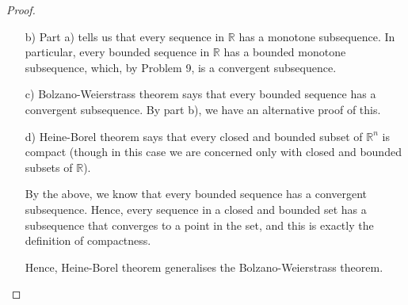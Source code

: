 \documentclass[11pt]{article}
\newcommand{\bbR}{\mathbb{R}}
\renewcommand{\_}[1]{\underline{ #1 }}
\theoremstyle{definition}
\numberwithin{equation}{subsection}
\begin{document}
\begin{proof}
\begin{enumerate}
This completes the proof.

\item[b)] Part a) tells us that every sequence in $\bbR$ has a monotone subsequence. In particular, every bounded sequence in $\bbR$ has a bounded monotone subsequence, which, by Problem 9, is a convergent subsequence.

\item[c)] Bolzano-Weierstrass theorem says that every bounded sequence has a convergent subsequence. By part b), we have an alternative proof of this.

\item[d)] Heine-Borel theorem says that every closed and bounded subset of $\bbR^n$ is compact (though in this case we are concerned only with closed and bounded subsets of $\bbR$). 

By the above, we know that every bounded sequence has a convergent subsequence. Hence, every sequence in a closed and bounded set has a subsequence that converges to a point in the set, and this is exactly the definition of compactness.

Hence, Heine-Borel theorem generalises the Bolzano-Weierstrass theorem. 
    
\end{enumerate}
\end{proof}
\end{document}
